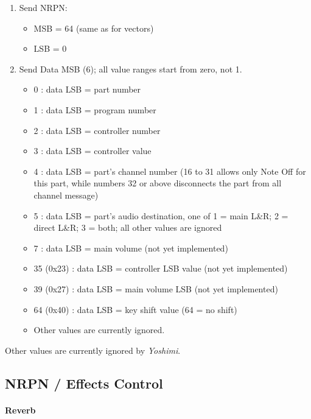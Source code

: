    \begin{enumerate}
      \item Send NRPN: 
      \begin{itemize}
         \item MSB = 64 (same as for vectors)
         \item LSB = 0
      \end{itemize}
      \item Send Data MSB (6); all value ranges start from zero, not 1.
      \begin{itemize}
         \item 0 : data LSB = part number
         \item 1 : data LSB = program number
         \item 2 : data LSB = controller number
         \item 3 : data LSB = controller value
         \item 4 : data LSB = part's channel number (16 to 31 allows only
            Note Off for this part, while numbers 32 or above disconnects
            the part from all channel message)
         \item 5 : data LSB = part's audio destination, one of
                    1 = main L\&R;
                    2 = direct L\&R;
                    3 = both;
                    all other values are ignored
         \item 7 : data LSB = main volume (not yet implemented)
         \item 35 (0x23) : data LSB = controller LSB value (not yet implemented)
         \item 39 (0x27) : data LSB = main volume LSB (not yet implemented)
         \item 64 (0x40) : data LSB = key shift value (64 = no shift)
         \item Other values are currently ignored.
      \end{itemize}
   \end{enumerate}

   Other values are currently ignored by \textsl{Yoshimi}.

\subsection{NRPN / Effects Control}
\label{subsection:nrpns_midi_nrpn_effects_control}

\paragraph{Reverb}

